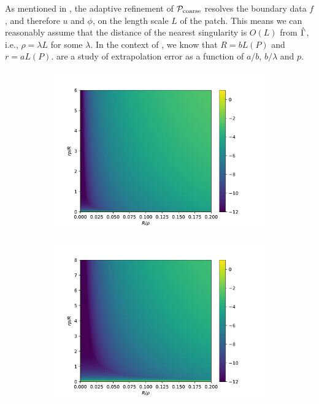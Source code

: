 As mentioned in \cite[Section 3.4]{RBZ}, the adaptive refinement of ${\mathcal{P}_{\mathrm{coarse}}}$ resolves the boundary data $f$, and therefore $u$ and $\phi$, on the length scale $L$ of the patch.
This means we can reasonably assume that the distance of the nearest singularity is $O(L)$ from $\hat{\Gamma}$, i.e., $\rho = \lambda L$ for some $\lambda$.
In the context of \qbkix, we know that $R=bL(P)$ and $r=aL(P)$.
are a study of extrapolation error as a function of $a/b$, $b/\lambda$ and $p$.


\begin{figure}[!htb]
  \centering
  \hfill

  \begin{subfigure}{.33\textwidth}
      \centering
      \includegraphics[width=\linewidth]{figs/extrapolation_error_plot_p6.pdf}
    \caption{\label{fig:extrap-err-p6}}
  \end{subfigure}
  \begin{subfigure}{.33\textwidth}
      \centering
      \includegraphics[width=\linewidth]{figs/extrapolation_error_plot_p8.pdf}

\end{subfigure}
\end{figure}
